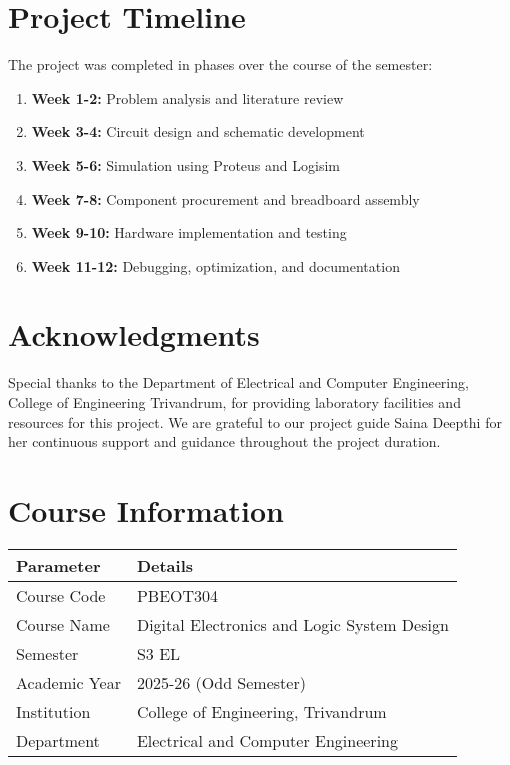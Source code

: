 \section{Project Timeline}

The project was completed in phases over the course of the semester:

\begin{enumerate}
    \item \textbf{Week 1-2:} Problem analysis and literature review
    \item \textbf{Week 3-4:} Circuit design and schematic development
    \item \textbf{Week 5-6:} Simulation using Proteus and Logisim
    \item \textbf{Week 7-8:} Component procurement and breadboard assembly
    \item \textbf{Week 9-10:} Hardware implementation and testing
    \item \textbf{Week 11-12:} Debugging, optimization, and documentation
\end{enumerate}

\section{Acknowledgments}

Special thanks to the Department of Electrical and Computer Engineering, College of Engineering Trivandrum, for providing laboratory facilities and resources for this project. We are grateful to our project guide Saina Deepthi for her continuous support and guidance throughout the project duration.

\section{Course Information}

\begin{table}[h]
\centering
\begin{tabular}{ll}
\toprule
\textbf{Parameter} & \textbf{Details} \\
\midrule
Course Code & PBEOT304 \\
Course Name & Digital Electronics and Logic System Design \\
Semester & S3 EL \\
Academic Year & 2025-26 (Odd Semester) \\
Institution & College of Engineering, Trivandrum \\
Department & Electrical and Computer Engineering \\
\bottomrule
\end{tabular}
\label{tab:course-info}
\end{table}